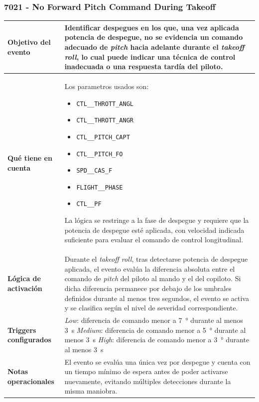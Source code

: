 \documentclass[11pt,a4paper]{article}
\begin{document}
	\subsubsection{7021 - No Forward Pitch Command During Takeoff}
	\begin{table}[H]
		\centering
		\renewcommand{\arraystretch}{1.3}
		\begin{tabular}{p{5cm} p{9.5cm}}
			\hline
			\textbf{Objetivo del evento} &
			Identificar despegues en los que, una vez aplicada potencia de despegue, no se evidencia un comando adecuado de \textit{pitch} hacia adelante durante el \textit{takeoff roll}, lo cual puede indicar una técnica de control inadecuada o una respuesta tardía del piloto. \\
			\hline
			\textbf{Qué tiene en cuenta} & Los parametros usados son:
			\begin{itemize}
				\item \texttt{CTL\_\_THROTT\_ANGL}
				\item \texttt{CTL\_\_THROTT\_ANGR}
				\item \texttt{CTL\_\_PITCH\_CAPT}
				\item \texttt{CTL\_\_PITCH\_FO}
				\item \texttt{SPD\_\_CAS\_F}
				\item \texttt{FLIGHT\_\_PHASE}
				\item \texttt{CTL\_\_PF}
			\end{itemize}
			La lógica se restringe a la fase de despegue y requiere que la potencia de despegue esté aplicada, con velocidad indicada suficiente para evaluar el comando de control longitudinal. \\
			\hline
			\textbf{Lógica de activación} &
			Durante el \textit{takeoff roll}, tras detectarse potencia de despegue aplicada, el evento evalúa la diferencia absoluta entre el comando de \textit{pitch} del piloto al mando y el del copiloto. Si dicha diferencia permanece por debajo de los umbrales definidos durante al menos tres segundos, el evento se activa y se clasifica según el nivel de severidad correspondiente. \\
			\hline
			\textbf{Triggers configurados} &
			\textit{Low}: diferencia de comando menor a \SI{7}{\degree} durante al menos \SI{3}{\second} \newline
			\textit{Medium}: diferencia de comando menor a \SI{5}{\degree} durante al menos \SI{3}{\second} \newline
			\textit{High}: diferencia de comando menor a \SI{3}{\degree} durante al menos \SI{3}{\second} \\
			\hline
			\textbf{Notas operacionales} &
			El evento se evalúa una única vez por despegue y cuenta con un tiempo mínimo de espera antes de poder activarse nuevamente, evitando múltiples detecciones durante la misma maniobra. \\
			\hline
		\end{tabular}
	\end{table}
	
\end{document}
